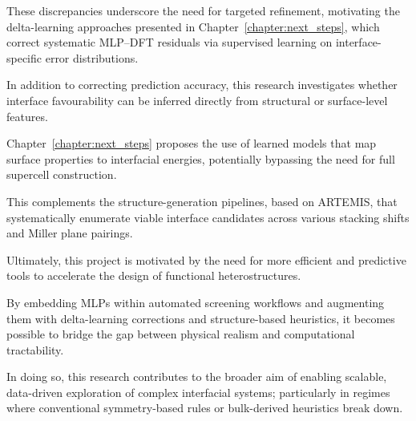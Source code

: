 These discrepancies underscore the need for targeted refinement, motivating the delta-learning approaches presented in
Chapter~\ref{chapter:next_steps}, which correct systematic MLP–DFT residuals via supervised learning on
interface-specific error distributions.

\label{para:feature_based_interface_prediction} %

In addition to correcting prediction accuracy, this research investigates whether interface favourability can be
inferred directly from structural or surface-level features.

Chapter~\ref{chapter:next_steps} proposes the use of learned models that map surface properties to interfacial energies,
potentially bypassing the need for full supercell construction.

This complements the structure-generation pipelines, based on ARTEMIS, that systematically enumerate viable interface
candidates across various stacking shifts and Miller plane pairings.

\label{para:project_motivation} %

Ultimately, this project is motivated by the need for more efficient and predictive tools to accelerate the design of
functional heterostructures.

By embedding MLPs within automated screening workflows and augmenting them with delta-learning corrections and
structure-based heuristics, it becomes possible to bridge the gap between physical realism and computational
tractability.

In doing so, this research contributes to the broader aim of enabling scalable, data-driven exploration of complex
interfacial systems; particularly in regimes where conventional symmetry-based rules or bulk-derived heuristics break
down.

